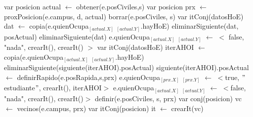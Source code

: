 \begin{algorithm}[H]
\begin{algorithmic}[1]
 
	\State var posicion actual $\gets$ obtener(e.posCiviles,s)  
	\State var posicion prx $\gets$ proxPosicion(e.campus, d, actual)  
		\State borrar(e.posCiviles, s) 
		\State var itConj(datosHoE) dat $\gets$ copia(e.quienOcupa$_{[actual.X]}$ $_{[actual.Y]}$.hayHoE) 
		\State eliminarSiguiente(dat, posActual) 
		\State eliminarSiguiente(dat) 
		\State e.quienOcupa$_{[actual.X]}$ $_{[actual.Y]}$ $\gets$ $<$ false, "nada", crearIt(), crearIt() $>$ 
	\Else
		\State var itConj(datosHoE) iterAHOI $\gets$ copia(e.quienOcupa$_{[actual.X]}$ $_{[actual.Y]}$.hayHoE) 
		\State eliminarSiguiente(siguiente(iterAHOI).posActual) 
		\State siguiente(iterAHOI).posActual $\gets$ definirRapido(e.posRapida,s,prx) 
		\State e.quienOcupa$_{[prx.X]}$ $_{[prx.Y]}$ $\gets$ $<$true, $"$estudiante$"$, crearIt(), iterAHOI$>$ 
		\State e.quienOcupa$_{[actual.X]}$ $_{[actual.Y]}$ $\gets$ $<$false, "nada", crearIt(), crearIt()$>$ 
		\State definir(e.posCiviles, s, prx) 
		\State var conj(posicion) vc $\gets$ vecinos(e.campus, prx) 
		\State var itConj(posicion) it $\gets$ crearIt(vc) 
		

\end{algorithmic}
\end{algorithm}
